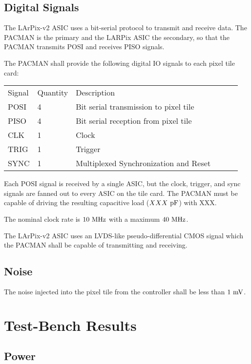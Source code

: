 \documentclass[12pt]{article}
\begin{document}
\subsection{Digital Signals}

The LArPix-v2 ASIC uses a bit-serial protocol to transmit and receive
data.  The PACMAN is the primary and the LARPix ASIC the secondary, so
that the PACMAN transmits POSI and receives PISO signals.

The PACMAN shall provide the following digital IO signals to each
pixel tile card:
\begin{center}
\begin{tabular}{llllll}
Signal & Quantity & Description \\
  POSI & 4 & Bit serial transmission to pixel tile \\
  PISO & 4 & Bit serial reception from pixel tile \\
  CLK  & 1 & Clock \\
  TRIG & 1 & Trigger \\
  SYNC & 1 & Multiplexed Synchronization and Reset \\
\end{tabular}
\end{center}

Each POSI signal is received by a single ASIC, but the clock, trigger,
and sync signals are fanned out to every ASIC on the tile card.  The
PACMAN must be capable of driving the resulting capacitive load
($XXX\rm~pF$) with XXX.

The nominal clock rate is $10~\rm MHz$ with a maximum $40~\rm MHz$.

The LArPix-v2 ASIC uses an LVDS-like pseudo-differential CMOS signal
which the PACMAN shall be capable of transmitting and receiving.

\subsection{Noise}

The noise injected into the pixel tile from the controller shall be
less than $1~\rm mV$.


\section{Test-Bench Results}

\subsection{Power}
\end{document}
